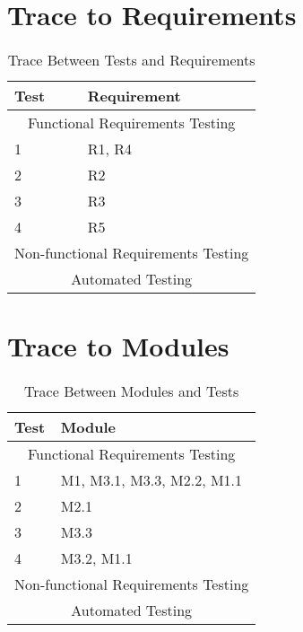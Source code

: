 \section{Trace to Requirements} %

\begin{table}[H!]
\centering
\begin{tabular}{p{} p{}}
\toprule
\textbf{Test} & \textbf{Requirement}\\
\midrule
\multicolumn{2}{c}{Functional Requirements Testing} \\
\midrule
1 & R1, R4 \\
2 & R2 \\
3 & R3 \\
4 & R5 \\
\midrule
\multicolumn{2}{c}{Non-functional Requirements Testing} \\
\midrule

\midrule
\multicolumn{2}{c}{Automated Testing} \\
\midrule
\bottomrule
\end{tabular}
\caption{Trace Between Tests and Requirements}
\end{table}
		
\section{Trace to Modules} %

\begin{table}[H!]
\centering
\begin{tabular}{p{} p{}}
\toprule
\textbf{Test} & \textbf{Module}\\
\midrule
\multicolumn{2}{c}{Functional Requirements Testing} \\
\midrule
1 & M1, M3.1, M3.3, M2.2, M1.1 \\
2 & M2.1 \\
3 & M3.3 \\
4 & M3.2, M1.1 \\
\midrule
\multicolumn{2}{c}{Non-functional Requirements Testing} \\
\midrule

\midrule
\multicolumn{2}{c}{Automated Testing} \\
\midrule
\bottomrule
\end{tabular}
\caption{Trace Between Modules and Tests}
\end{table}